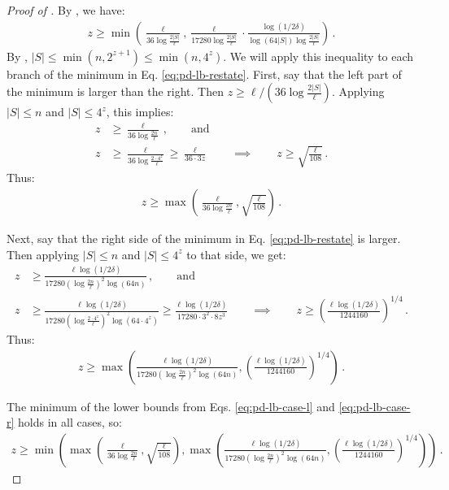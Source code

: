 \documentclass[10pt,a4paper]{article}
\theoremstyle{definition}
\theoremstyle{remark}
\newcommand{\rl}{\mathbf{\ell}}             %
\begin{document}
\begin{itemize}
\begin{itemize}
\begin{proof}[Proof of ]
  By , we have:
  \begin{align}
    z \ge \min\left(
      \frac{\rl}{36 \log\frac{2 |S|}{\rl}},
      \frac{\rl}{17280 \log\frac{2 |S|}{\rl}} \cdot \frac{\log(1/2\delta)}{\log(64 |S|) \log\frac{2 |S|}{\rl}}
    \right) \,.\label{eq:pd-lb-restate}
  \end{align}
  By , $|S| \le \min(n, 2^{z+1}) \le \min(n, 4^z)$. We will apply this
  inequality to each branch of the minimum in Eq. \ref{eq:pd-lb-restate}. First, say that
  the left part of the minimum is larger than the right. Then $z \ge \rl / (36 \log\frac{2 |S|}{\rl})$.
  Applying $|S| \le n$ and $|S| \le 4^z$, this implies:
  \begin{align*}
    z &\ge \frac{\rl}{36 \log\frac{2 n}{\rl}} \,, \qquad \text{and} \\
    z &\ge \frac{\rl}{36 \log\frac{2 \cdot 4^z}{\rl}} \ge \frac{\rl}{36 \cdot 3 z} \qquad \implies \qquad z \ge \sqrt{\frac{\rl}{108}} \,.
  \end{align*}
  Thus:
  \begin{align}
    z \ge \max\left(\frac{\rl}{36 \log\frac{2 n}{\rl}}, \sqrt{\frac{\rl}{108}} \right) \,.\label{eq:pd-lb-case-l}
  \end{align}

  Next, say that the right side of the minimum in Eq. \ref{eq:pd-lb-restate} is larger.
  Then applying $|S| \le n$ and $|S| \le 4^z$ to that side, we get:
  \begin{align*}
    z &\ge \frac{\rl \log(1/2\delta)}{17280 (\log\frac{2 n}{\rl})^2 \log(64 n)} \,, \qquad \text{and} \\
    z &\ge \frac{\rl \log(1/2\delta)}{17280 (\log\frac{2 \cdot 4^z}{\rl})^2 \log(64 \cdot 4^z)} \ge \frac{\rl \log(1/2\delta)}{17280 \cdot 3^2 \cdot 8 z^3} \qquad \implies \qquad z \ge \left(\frac{\rl \log(1/2\delta)}{1244160}\right)^{1/4} \,.
  \end{align*}
  Thus:
  \begin{align}
    z \ge \max\left(
      \frac{\rl \log(1/2\delta)}{17280 (\log\frac{2 n}{\rl})^2 \log(64 n)},
      \left(\frac{\rl \log(1/2\delta)}{1244160}\right)^{1/4}
    \right) \,.\label{eq:pd-lb-case-r}
  \end{align}

  The minimum of the lower bounds from Eqs. \ref{eq:pd-lb-case-l} and \ref{eq:pd-lb-case-r}
  holds in all cases, so:
  \begin{align*}
    z \ge \min\left(\max\left(\frac{\rl}{36 \log\frac{2 n}{\rl}}, \sqrt{\frac{\rl}{108}}\right), \max\left(\frac{\rl \log(1/2\delta)}{17280 (\log\frac{2 n}{\rl})^2 \log(64n)},\left(\frac{\rl \log(1/2\delta)}{1244160}\right)^{1/4}\right)\right) \,.
  \end{align*}
\end{proof}


\end{itemize}
\end{itemize}
\end{document}
